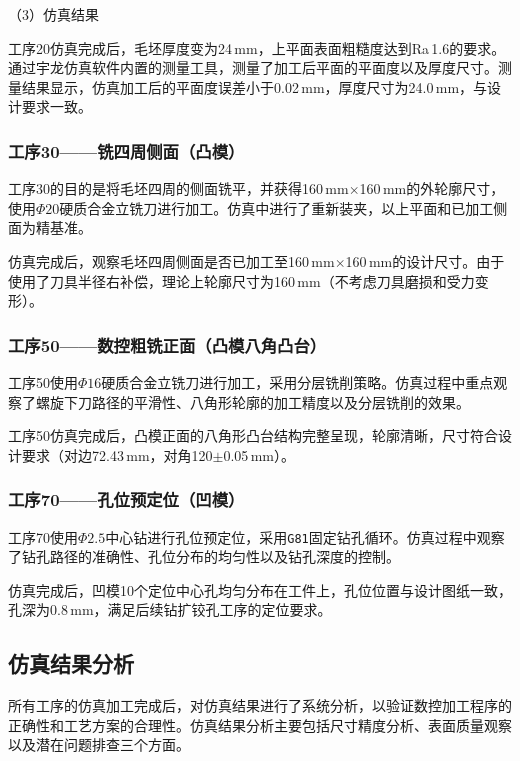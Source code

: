 \documentclass{xautCADreport}
\begin{document}
（3）仿真结果

工序20仿真完成后，毛坯厚度变为24\,mm，上平面表面粗糙度达到Ra\,1.6的要求。通过宇龙仿真软件内置的测量工具，测量了加工后平面的平面度以及厚度尺寸。测量结果显示，仿真加工后的平面度误差小于0.02\,mm，厚度尺寸为24.0\,mm，与设计要求一致。

\subsubsection{工序30——铣四周侧面（凸模）}

工序30的目的是将毛坯四周的侧面铣平，并获得160\,mm$\times$160\,mm的外轮廓尺寸，使用$\Phi20$硬质合金立铣刀进行加工。仿真中进行了重新装夹，以上平面和已加工侧面为精基准。

仿真完成后，观察毛坯四周侧面是否已加工至160\,mm$\times$160\,mm的设计尺寸。由于使用了刀具半径右补偿，理论上轮廓尺寸为160\,mm（不考虑刀具磨损和受力变形）。

\subsubsection{工序50——数控粗铣正面（凸模八角凸台）}

工序50使用$\Phi16$硬质合金立铣刀进行加工，采用分层铣削策略。仿真过程中重点观察了螺旋下刀路径的平滑性、八角形轮廓的加工精度以及分层铣削的效果。

工序50仿真完成后，凸模正面的八角形凸台结构完整呈现，轮廓清晰，尺寸符合设计要求（对边72.43\,mm，对角120$\pm$0.05\,mm）。

\subsubsection{工序70——孔位预定位（凹模）}

工序70使用$\Phi2.5$中心钻进行孔位预定位，采用\texttt{G81}固定钻孔循环。仿真过程中观察了钻孔路径的准确性、孔位分布的均匀性以及钻孔深度的控制。

仿真完成后，凹模10个定位中心孔均匀分布在工件上，孔位位置与设计图纸一致，孔深为0.8\,mm，满足后续钻扩铰孔工序的定位要求。

\subsection{仿真结果分析}

所有工序的仿真加工完成后，对仿真结果进行了系统分析，以验证数控加工程序的正确性和工艺方案的合理性。仿真结果分析主要包括尺寸精度分析、表面质量观察以及潜在问题排查三个方面。
\end{document}
